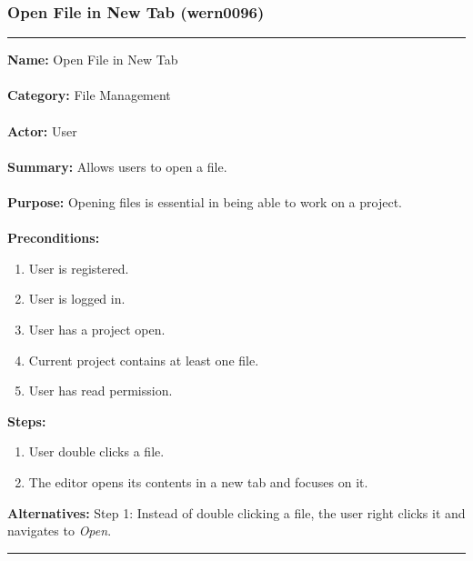 \documentclass[11pt]{report}
\begin{document}
\newpage

\subsubsection{Open File in New Tab (wern0096)}
\vspace{2pt}
\hrule
\vspace{8pt}
	\noindent\textbf{Name:} Open File in New Tab \\ \\
	\textbf{Category:} File Management \\ \\
	\textbf{Actor:} User \\ \\
	\textbf{Summary:} Allows users to open a file. \\ \\
	\textbf{Purpose:} Opening files is essential in being able to work on a project. \\ \\
	\textbf{Preconditions:} 
	\begin{enumerate}
		\item User is registered.
		\item User is logged in.
		\item User has a project open.
		\item Current project contains at least one file.
		\item User has read permission.
	\end{enumerate}		
	\textbf{Steps:}
	\begin{enumerate}
		\item User double clicks a file.
		\item The editor opens its contents in a new tab and focuses on it.
	\end{enumerate}	
	\textbf{Alternatives:} Step 1: Instead of double clicking a file, the user right clicks it and navigates to \textit{Open}.
\hrule
\vspace{8pt}

\newpage
\end{document}
